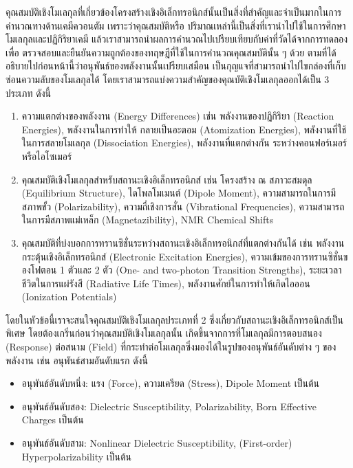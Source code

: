คุณสมบัติเชิงโมเลกุลที่เกี่ยวข้องโครงสร้างเชิงอิเล็กทรอนิกส์นั้นเป็นสิ่งที่สำคัญและจำเป็นมากในการคำนวณทางด้านเคมีควอนตัม เพราะว่าคุณสมบัติหรือ%
ปริมาณเหล่านี้เป็นสิ่งที่เรานำไปใช้ในการศึกษาโมเลกุลและปฏิกิริยาเคมี แล้วเราสามารถนำผลการคำนวณไปเปรียบเทียบกับค่าที่วัดได้จากการทดลองเพื่อ%
ตรวจสอบและยืนยันความถูกต้องของทฤษฎีที่ใช้ในการคำนวณคุณสมบัตินั้น ๆ ด้วย ตามที่ได้อธิบายไปก่อนหน้านี้ว่าอนุพันธ์ของพลังงานนั้นเปรียบเสมือน%
เป็นกุญแจที่สามารถนำไปไขกล่องที่เก็บซ่อนความลับของโมเลกุลได้ โดยเราสามารถแบ่งความสำคัญของคุณบัติเชิงโมเลกุลออกได้เป็น 3 ประเภท ดังนี้
%
\begin{enumerate}[topsep=0pt,noitemsep]\setlength\itemsep{0.5em}
    \item ความแตกต่างของพลังงาน (Energy Differences) เช่น พลังงานของปฏิกิริยา (Reaction Energies), พลังงานในการทำให้%
          กลายเป็นอะตอม (Atomization Energies), พลังงานที่ใช้ในการสลายโมเลกุล (Dissociation Energies), พลังงานที่แตกต่างกัน%
          ระหว่างคอนฟอร์เมอร์หรือไอโซเมอร์

    \item คุณสมบัติเชิงโมเลกุลสำหรับสถานะเชิงอิเล็กทรอนิกส์ เช่น โครงสร้าง ณ สภาวะสมดุล (Equilibrium Structure), ไดโพลโมเมนต์
          (Dipole Moment), ความสามารถในการมีสภาพขั้ว (Polarizability), ความถี่เชิงการสั่น (Vibrational Frequencies),
          ความสามารถในการมีสภาพแม่เหล็ก (Magnetazibility), NMR Chemical Shifts

    \item คุณสมบัติที่บ่งบอกการทรานซิชั่นระหว่างสถานะเชิงอิเล็กทรอนิกส์ที่แตกต่างกันได้ เช่น พลังงานกระตุ้นเชิงอิเล็กทรอนิกส์ (Electronic
          Excitation Energies), ความเข้มของการทรานซิชั่นของโฟตอน 1 ตัวและ 2 ตัว (One- and two-photon Transition Strengths),
          ระยะเวลาชีวิตในการแผ่รังสี (Radiative Life Times), พลังงานศักย์ในการทำให้เกิดไอออน (Ionization Potentials)
\end{enumerate}

โดยในหัวข้อนี้เราจะสนใจคุณสมบัติเชิงโมเลกุลประเภทที่ 2 ซึ่งเกี่ยวกับสถานะเชิงอิเล็กทรอนิกส์เป็นพิเศษ โดยต้องเกริ่นก่อนว่าคุณสมบัติเชิงโมเลกุลนั้น%
เกิดขึ้นจากการที่โมเลกุลมีการตอบสนอง (Response) ต่อสนาม (Field) ที่กระทำต่อโมเลกุลซึ่งมองได้ในรูปของอนุพันธ์อันดับต่าง ๆ ของพลังงาน
เช่น อนุพันธ์สามอันดับแรก ดังนี้

\begin{itemize}[topsep=0pt,noitemsep]\setlength\itemsep{0.5em}
    \item อนุพันธ์อันดับหนึ่ง: แรง (Force), ความเครียด (Stress), Dipole Moment เป็นต้น
    \item อนุพันธ์อันดับสอง: Dielectric Susceptibility, Polarizability, Born Effective Charges เป็นต้น
    \item อนุพันธ์อันดับสาม: Nonlinear Dielectric Susceptibility, (First-order) Hyperpolarizability เป็นต้น
\end{itemize}

